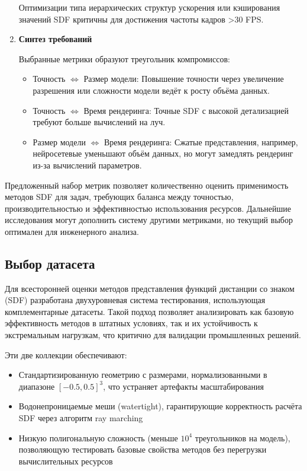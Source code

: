 \documentclass[a4paper,hidelinks,12pt]{article}
\begin{document}
\begin{enumerate}
	Оптимизации типа иерархических структур ускорения или кэширования значений SDF критичны для достижения частоты кадров >30 FPS.

	\item \textbf{Синтез требований}
	\par
	Выбранные метрики образуют треугольник компромиссов:
	\begin{itemize}
		\item Точность $\Leftrightarrow $ Размер модели: Повышение точности через увеличение разрешения или сложности модели ведёт к росту объёма данных.
		\item Точность $\Leftrightarrow $ Время рендеринга: Точные SDF с высокой детализацией требуют больше вычислений на луч.
		\item Размер модели $\Leftrightarrow $ Время рендеринга: Сжатые представления, например, нейросетевые уменьшают объём данных, но могут замедлять рендеринг из-за вычислений параметров.
	\end{itemize}
\end{enumerate}

\par
Предложенный набор метрик позволяет количественно оценить применимость методов SDF для задач, требующих баланса между точностью, производительностью и эффективностью использования ресурсов. Дальнейшие исследования могут дополнить систему другими метриками, но текущий выбор оптимален для инженерного анализа.

\newpage

\subsection{Выбор датасета}

Для всесторонней оценки методов представления функций дистанции со знаком (SDF) разработана двухуровневая система 
тестирования, использующая комплементарные датасеты. Такой подход позволяет анализировать как базовую эффективность 
методов в штатных условиях, так и их устойчивость к экстремальным нагрузкам, что критично для валидации промышленных решений.

Эти  две коллекции обеспечивают:

\begin{itemize}
	\item Стандартизированную геометрию с размерами, нормализованными в диапазоне $[-0.5, 0.5]^3$, что устраняет артефакты масштабирования
	\item Водонепроницаемые меши (watertight), гарантирующие корректность расчёта SDF через алгоритм ray marching
	\item Низкую полигональную сложность (меньше $10^4$ треугольников на модель), позволяющую тестировать базовые свойства методов без перегрузки вычислительных ресурсов
\end{itemize}
\end{document}
